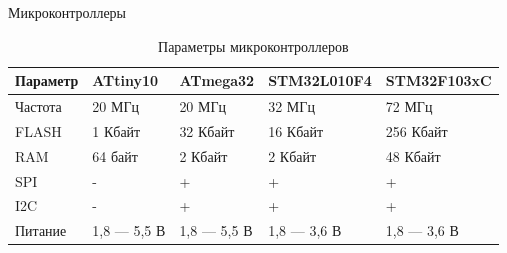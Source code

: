 \documentclass[10pt]{beamer}
\begin{document}
\begin{frame}{Микроконтроллеры}
\begin{small}
\begin{table}[H]
\caption{Параметры микроконтроллеров}
\begin{tabular}{|p{1.5 cm}|p{1.9 cm}|p{1.9 cm}|p{1.9 cm}|p{1.9 cm}|}
\hline
        Параметр & ATtiny10 & ATmega32 & STM32L010F4 & STM32F103xC \\ \hline
        Частота & 20 МГц & 20 МГц & 32 МГц & 72 МГц \\ \hline
        FLASH & 1 Кбайт & 32 Кбайт & 16 Кбайт & 256 Кбайт \\ \hline
        RAM & 64 байт & 2 Кбайт & 2 Кбайт & 48 Кбайт \\ \hline
        SPI & - & + & + & + \\ \hline
        I2C & - & +	 & + & + \\ \hline
        Питание & 1,8 --- 5,5 В & 1,8 --- 5,5 В & 1,8 --- 3,6 В & 1,8 --- 3,6 В \\ \hline
\end{tabular}
\end{table}
\end{small}
\end{frame}
\end{document}
